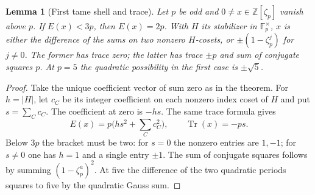 \documentclass[11pt,a4paper]{article}
\numberwithin{equation}{section}
\newtheorem{lemma}[theorem]{Lemma}
\theoremstyle{remark}
\newcommand{\ZZ}{\mathbb Z}
\newcommand{\Tr}{\operatorname{Tr}}
\begin{document}
\begin{lemma}[First tame shell and trace]\label{fam:M:5.4}\label{lem:fifth-residue-first-shell}
Let $p$ be odd and $0\ne x\in\ZZ[\zeta_p]$ vanish above $p$.
If $E(x)<3p$, then $E(x)=2p$. With $H$ its stabilizer in
$\mathbb F_p^\times$, $x$ is either the difference of the sums
on two nonzero $H$-cosets, or $\pm(1-\zeta_p^j)$ for $j\ne0$.
The former has trace zero; the latter has trace $\pm p$ and sum of
conjugate squares $p$. At $p=5$ the quadratic possibility in the
first case is $\pm\sqrt5$.
\end{lemma}
\begin{proof}
Take the unique coefficient vector of sum zero as in the theorem.
For $h=|H|$, let $c_C$ be its integer coefficient on each nonzero
index coset of $H$ and put $s=\sum_Cc_C$. The coefficient at zero
is $-hs$. The same trace formula gives
\[
 E(x)=p\bigl(hs^2+\sum_C c_C^2\bigr),\qquad \Tr(x)=-ps.
\]
Below $3p$ the bracket must be two: for $s=0$ the nonzero entries
are $1,-1$; for $s\ne0$ one has $h=1$ and a single entry $\pm1$.
The sum of conjugate squares follows by summing $(1-\zeta_p^a)^2$.
At five the difference of the two quadratic periods squares to five
by the quadratic Gauss sum.
\end{proof}
\end{document}
